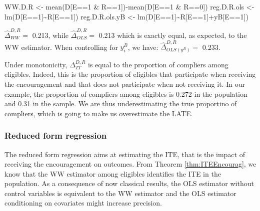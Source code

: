\documentclass[
]{book}
\newenvironment{Shaded}{\begin{snugshade}}{\end{snugshade}}
\newcommand{\DecValTok}[1]{\textcolor[rgb]{0.00,0.00,0.81}{#1}}
\newcommand{\FunctionTok}[1]{\textcolor[rgb]{0.00,0.00,0.00}{#1}}
\newcommand{\NormalTok}[1]{#1}
\newcommand{\OtherTok}[1]{\textcolor[rgb]{0.56,0.35,0.01}{#1}}
\newcommand{\SpecialCharTok}[1]{\textcolor[rgb]{0.00,0.00,0.00}{#1}}
\theoremstyle{definition}
\theoremstyle{definition}
\theoremstyle{definition}
\theoremstyle{definition}
\theoremstyle{remark}
\begin{document}
\begin{Shaded}
\begin{Highlighting}[]
\NormalTok{WW.D.R }\OtherTok{\textless{}{-}} \FunctionTok{mean}\NormalTok{(D[E}\SpecialCharTok{==}\DecValTok{1} \SpecialCharTok{\&}\NormalTok{ R}\SpecialCharTok{==}\DecValTok{1}\NormalTok{])}\SpecialCharTok{{-}}\FunctionTok{mean}\NormalTok{(D[E}\SpecialCharTok{==}\DecValTok{1} \SpecialCharTok{\&}\NormalTok{ R}\SpecialCharTok{==}\DecValTok{0}\NormalTok{])}
\NormalTok{reg.D.R.ols }\OtherTok{\textless{}{-}} \FunctionTok{lm}\NormalTok{(D[E}\SpecialCharTok{==}\DecValTok{1}\NormalTok{]}\SpecialCharTok{\textasciitilde{}}\NormalTok{R[E}\SpecialCharTok{==}\DecValTok{1}\NormalTok{])}
\NormalTok{reg.D.R.ols.yB }\OtherTok{\textless{}{-}} \FunctionTok{lm}\NormalTok{(D[E}\SpecialCharTok{==}\DecValTok{1}\NormalTok{]}\SpecialCharTok{\textasciitilde{}}\NormalTok{R[E}\SpecialCharTok{==}\DecValTok{1}\NormalTok{]}\SpecialCharTok{+}\NormalTok{yB[E}\SpecialCharTok{==}\DecValTok{1}\NormalTok{])}
\end{Highlighting}
\end{Shaded}

\(\hat{\Delta}^{D,R}_{WW} =\) 0.213, while \(\hat{\Delta}^{D,R}_{OLS}=\) 0.213 which is exactly equal, as expected, to the WW estimator.
When controlling for \(y^B_i\), we have: \(\hat{\Delta}^{D,R}_{OLS(y^B)}=\) 0.233.

Under monotonicity, \(\Delta^{D,R}_{TT}\) is equal to the proportion of compliers among eligibles.
Indeed, this is the proportion of eligibles that participate when receiving the encouragement and that does not participate when not receiving it.
In our example, the proportion of compliers among eligibles is 0.272 in the population and 0.31 in the sample.
We are thus underestimating the true proportino of compliers, which is going to make us overestimate the LATE.

\hypertarget{reduced-form-regression}{%
\subsubsection{Reduced form regression}\label{reduced-form-regression}}

The reduced form regression aims at estimating the ITE, that is the impact of receiving the encouragement on outcomes.
From Theorem \ref{thm:ITEEncourag}, we know that the WW estimator among eligibles identifies the ITE in the population.
As a consequence of now classical results, the OLS estimator without control variables is equivalent to the WW estimator and the OLS estimator conditioning on covariates might increase precision.
\end{document}

